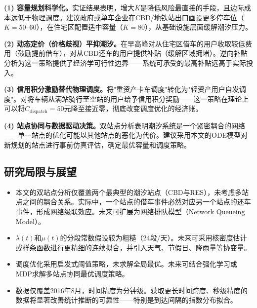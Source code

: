 \documentclass[12pt,a4paper]{article}
\begin{document}
\textbf{(1) 容量规划科学化。}实证结果表明，增大$K$是降低风险最直接的手段，且边际成本远低于物理调度。建议政府或单车企业在CBD/地铁站出口画设更多停车位（$K=50$--60），在住宅区配置适中容量（$K=80$），从基础设施层面缓解潮汐压力。

\textbf{(2) 动态定价（价格歧视）平抑潮汐。}在早高峰对从住宅区借车的用户收取较低费用（鼓励提前借车），对从CBD还车的用户提供补贴（缓解区域拥堵）。逆向补贴分析为这一策略提供了经济学可行性边界——系统可承受的最高补贴远高于实际投入。

\textbf{(3) 信用积分激励替代物理调度。}将"重资产卡车调度"转化为"轻资产用户自发调度"。对将车辆从满站骑行至空站的用户给予信用积分奖励——这一策略在理论上可以将$C_{\text{dispatch}}=50$元降至接近零，彻底改变调度优化的经济账。

\textbf{(4) 站点协同与数据驱动决策。}双站点分析表明潮汐系统是一个紧密耦合的网络——单一站点的优化可能以其他站点的恶化为代价。建议采用本文的ODE模型对新规划的站点进行事前仿真评估，确定最优容量和调度策略。

\subsection{研究局限与展望}

\begin{itemize}
    \item 本文的双站点分析仅覆盖两个最典型的潮汐站点（CBD与RES），未考虑多站点之间的耦合关系。实际中，一个站点的借车事件必然对应另一个站点的还车事件，形成网络级联效应。未来可扩展为网络排队模型（Network Queueing Model）。
    
    \item $\lambda(t)$和$\mu(t)$的分段常数假设较为粗糙（24段/天）。未来可采用核密度估计或样条函数进行更精细的连续拟合，并引入天气、节假日、降雨量等协变量。
    
    \item 调度优化采用启发式阈值策略，未求解全局最优。未来可结合强化学习或MDP求解多站点协同最优调度策略。
    
    \item 数据仅覆盖2016年8月，时间精度为分钟级。获取更长时间跨度、秒级精度的数据将显著改善统计推断的可靠性——特别是到达间隔的指数分布拟合。
\end{itemize}
\end{document}
